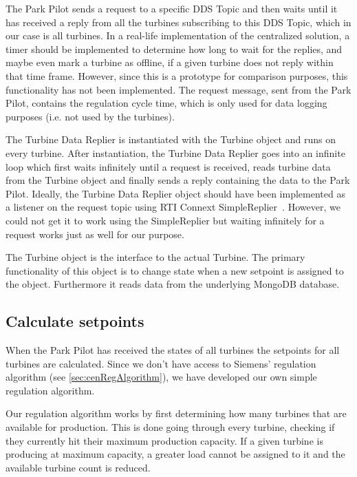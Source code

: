 The Park Pilot sends a request to a specific DDS Topic and then waits until it has received a reply from all the turbines subscribing to this DDS Topic, which in our case is all turbines. In a real-life implementation of the centralized solution, a timer should be implemented to determine how long to wait for the replies, and maybe even mark a turbine as offline, if a given turbine does not reply within that time frame. However, since this is a prototype for comparison purposes, this functionality has not been implemented. The request message, sent from the Park Pilot, contains the regulation cycle time, which is only used for data logging purposes (i.e. not used by the turbines).

The Turbine Data Replier is instantiated with the Turbine object and runs on every turbine. After instantiation, the Turbine Data Replier goes into an infinite loop which first waits infinitely until a request is received, reads turbine data from the Turbine object and finally sends a reply containing the data to the Park Pilot. Ideally, the Turbine Data Replier object should have been implemented as a listener on the request topic using RTI Connext SimpleReplier~\cite{rtiConnextUsersManual}. However, we could not get it to work using the SimpleReplier but waiting infinitely for a request works just as well for our purpose.

The Turbine object is the interface to the actual Turbine. The primary functionality of this object is to change state when a new setpoint is assigned to the object. Furthermore it reads data from the underlying MongoDB database. 

\subsection{Calculate setpoints}\label{sec:calculateSetpoints}

When the Park Pilot has received the states of all turbines the setpoints for all turbines are calculated. Since we don't have access to Siemens' regulation algorithm (see \cref{sec:cenRegAlgorithm}), we have developed our own simple regulation algorithm.

Our regulation algorithm works by first determining how many turbines that are available for production. This is done going through every turbine, checking if they currently hit their maximum production capacity. If a given turbine is producing at maximum capacity, a greater load cannot be assigned to it and the available turbine count is reduced. 

